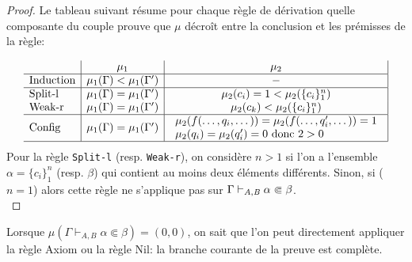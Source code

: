 \begin{proof}
  Le tableau suivant résume pour chaque règle de dérivation quelle composante du couple
  prouve que $\mu$ décroît entre la conclusion et les prémisses de la règle:
  
  \[\begin{array}[h]{l|c|c|}
    \footnotesize
    & \mu_1 & \mu_2 \\ \hline %
    \textrm{Induction}   & \strut \mu_1(\Gamma) < \mu_1(\Gamma') & - \\ \hline
    \textrm{Split-l} & \mu_1(\Gamma) = \mu_1(\Gamma') & 
      \mu_2(c_i) = 1 < \mu_2(\{c_i\}_1^n)\\

    \textrm{Weak-r} & \mu_1(\Gamma) = \mu_1(\Gamma') & \mu_2(c_k) < \mu_2(\{c_i\}_1^n)\\ \hline
    \textrm{Config} & \mu_1(\Gamma) = \mu_1(\Gamma') & 
    \begin{array}{l}
      \mu_2(f(\dots, q_i, \dots)) = \mu_2(f(\dots, q'_i, \dots)) = 1\\
      \mu_2(q_i) = \mu_2(q'_i) = 0 \textrm{ donc } 2 > 0
    \end{array}\\ \hline
\end{array} \]
Pour la règle \texttt{Split-l} (resp. \texttt{Weak-r}), on considère $n > 1$ si l'on a l'ensemble $\alpha = \{c_i\}_1^n$ (resp. $\beta$) qui contient
au moins deux éléments différents. Sinon, si ($n = 1$) alors cette règle ne s'applique pas sur ${\Gamma \vdash_{\mathit A, \mathit B} \alpha \Subset \beta}$.\\
\end{proof}


\begin{theorem}
  Lorsque $\mu(\Gamma \vdash_{A, B} \alpha \Subset \beta) = (0, 0)$, on sait que l'on peut directement appliquer la règle Axiom ou la règle Nil:
  la branche courante de la preuve est complète.
\end{theorem}


